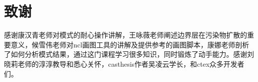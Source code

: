 \chapter[致谢]{致\quad 谢}%
\thispagestyle{noheaderstyle}%

感谢康汉青老师对模式的耐心操作讲解，王咏薇老师阐述边界层在污染物扩散的重要意义，候雪伟老师对ncl画图工具的讲解及提供参考的画图脚本，康娜老师剖析了如何分析模式结果，通过这门课程学习很多知识，同时锻炼了动手能力。感谢刘晓莉老师的淳淳教导和悉心关怀，casthesis作者吴凌云学长，和ctex众多开发者们。

\cleardoublepage[plain]%
